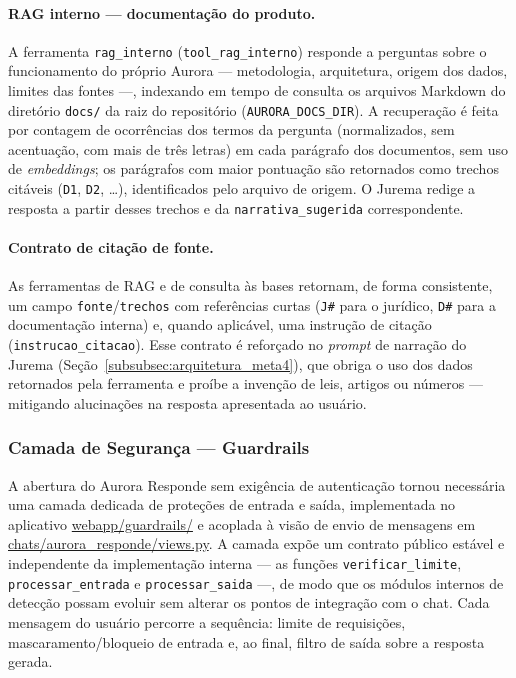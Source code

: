 \documentclass[11pt,a4paper]{article}
\begin{document}
\paragraph{RAG interno — documentação do produto.} A ferramenta \texttt{rag\_interno} (\texttt{tool\_rag\_interno}) responde a perguntas sobre o funcionamento do próprio Aurora — metodologia, arquitetura, origem dos dados, limites das fontes —, indexando em tempo de consulta os arquivos Markdown do diretório \texttt{docs/} da raiz do repositório (\texttt{AURORA\_DOCS\_DIR}). A recuperação é feita por contagem de ocorrências dos termos da pergunta (normalizados, sem acentuação, com mais de três letras) em cada parágrafo dos documentos, sem uso de \textit{embeddings}; os parágrafos com maior pontuação são retornados como trechos citáveis (\texttt{D1}, \texttt{D2}, \ldots), identificados pelo arquivo de origem. O Jurema redige a resposta a partir desses trechos e da \texttt{narrativa\_sugerida} correspondente.

\paragraph{Contrato de citação de fonte.} As ferramentas de RAG e de consulta às bases retornam, de forma consistente, um campo \texttt{fonte}/\texttt{trechos} com referências curtas (\texttt{J\#} para o jurídico, \texttt{D\#} para a documentação interna) e, quando aplicável, uma instrução de citação (\texttt{instrucao\_citacao}). Esse contrato é reforçado no \textit{prompt} de narração do Jurema (Seção~\ref{subsubsec:arquitetura_meta4}), que obriga o uso dos dados retornados pela ferramenta e proíbe a invenção de leis, artigos ou números — mitigando alucinações na resposta apresentada ao usuário.

\subsubsection{Camada de Segurança — Guardrails}
\label{subsubsec:guardrails_meta4}

A abertura do Aurora Responde sem exigência de autenticação tornou necessária uma camada dedicada de proteções de entrada e saída, implementada no aplicativo \url{webapp/guardrails/} e acoplada à visão de envio de mensagens em \url{chats/aurora_responde/views.py}. A camada expõe um contrato público estável e independente da implementação interna — as funções \texttt{verificar\_limite}, \texttt{processar\_entrada} e \texttt{processar\_saida} —, de modo que os módulos internos de detecção possam evoluir sem alterar os pontos de integração com o chat. Cada mensagem do usuário percorre a sequência: limite de requisições, mascaramento/bloqueio de entrada e, ao final, filtro de saída sobre a resposta gerada.
\end{document}
